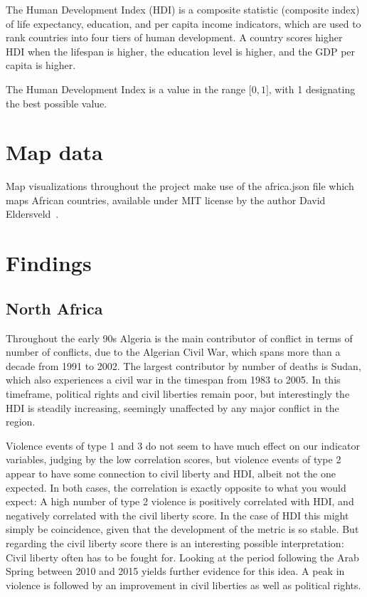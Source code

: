 \documentclass[a4paper,11pt]{article}
\begin{document}
The Human Development Index (HDI) is a composite statistic (composite
index) of life expectancy, education, and per capita income indicators,
which are used to rank countries into four tiers of human development. A
country scores higher HDI when the lifespan is higher, the education
level is higher, and the GDP per capita is higher.

The Human Development Index is a value in the range ${[}0,1{]}$, with 1 designating
the best possible value.

\section{Map data}
Map visualizations throughout the project make use of the africa.json file which maps African countries, available under MIT license by the author David Eldersveld~\cite{Eldersveld2017}.

\section{Findings}

\subsection{North Africa}
Throughout the early 90s Algeria is the main contributor of conflict in terms of number of conflicts, due to the Algerian Civil War, which spans more than a decade from 1991 to 2002. The largest contributor by number of deaths is Sudan, which also experiences a civil war in the timespan from 1983 to 2005. In this timeframe, political rights and civil liberties remain poor, but interestingly the HDI is steadily increasing, seemingly unaffected by any major conflict in the region.

Violence events of type 1 and 3 do not seem to have much effect on our indicator variables, judging by the low correlation scores, but violence events of type 2 appear to have some connection to civil liberty and HDI, albeit not the one expected. In both cases, the correlation is exactly opposite to what you would expect: A high number of type 2 violence is positively correlated with HDI, and negatively correlated with the civil liberty score. In the case of HDI this might simply be coincidence, given that the development of the metric is so stable. But regarding the civil liberty score there is an interesting possible interpretation: Civil liberty often has to be fought for. Looking at the period following the Arab Spring between 2010 and 2015 yields further evidence for this idea. A peak in violence is followed by an improvement in civil liberties as well as political rights.
\end{document}
